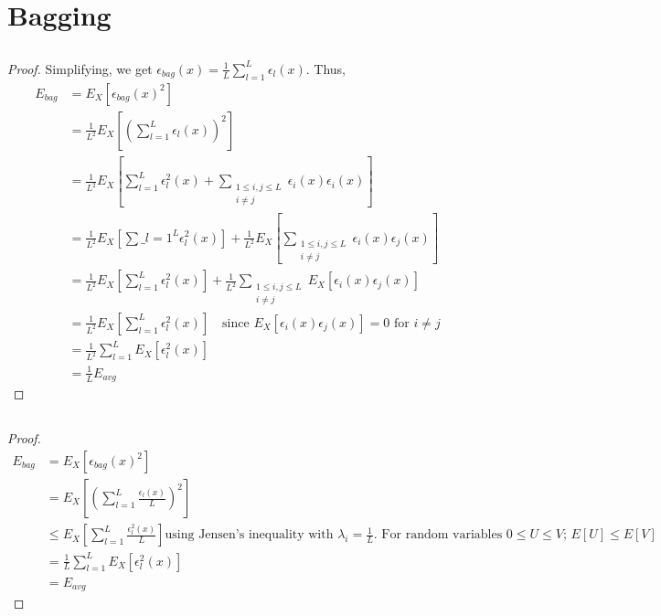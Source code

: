 \documentclass{article}
\begin{document}
\section{Bagging}
\subsection{}
\begin{proof}
	
Simplifying, we get $\epsilon_{bag}(x) = \frac{1}{L}\sum\limits_{l=1}^L \epsilon_l(x)$. Thus,
\begin{equation}
  \label{eq:1.2}
  \begin{split}
	  E_{bag} &= E_X\left[\epsilon_{bag}(x)^2\right] \\
	          &= \frac{1}{L^2}E_X\left[\left(\sum_{l=1}^L \epsilon_l(x)\right)^2\right] \\
			  &= \frac{1}{L^2}E_X\left[\sum_{l=1}^L \epsilon_l^2(x) + \sum_{\substack{1\leq i,j\leq L \\ i \neq j}}\epsilon_i(x)\epsilon_i(x) \right] \\
			  &= \frac{1}{L^2}E_X\left[\sum\_{l=1}^L \epsilon_l^2(x)\right]+ \frac{1}{L^2}E_X\left[\sum_{\substack{1\leq i,j\leq L \\ i \neq j}}\epsilon_i(x)\epsilon_j(x) \right] \\
			  &= \frac{1}{L^2}E_X\left[\sum_{l=1}^L \epsilon_l^2(x)\right]+ \frac{1}{L^2}\sum_{\substack{1\leq i,j\leq L \\ i \neq j}}E_X\left[\epsilon_i(x)\epsilon_j(x) \right] \\
			  &= \frac{1}{L^2}E_X\left[\sum_{l=1}^L \epsilon_l^2(x)\right] \quad \text{since $E_X\left[\epsilon_i(x)\epsilon_j(x)\right]=0$ for $i \neq j$} \\
			  &= \frac{1}{L^2} \sum_{l=1}^L E_X\left[ \epsilon_l^2(x)\right] \\
			  &= \frac{1}{L}E_{avg}
  \end{split}
\end{equation}
\end{proof}


\subsection{}
\begin{proof}
\begin{equation}
  \label{eq:1.3}
  \begin{split}
	  E_{bag} &= E_X\left[\epsilon_{bag}(x)^2\right] \\
	          &= E_X\left[\left(\sum_{l=1}^L \frac{\epsilon_l(x)}{L}\right)^2\right] \\
			  &\leq E_X\left[\sum_{l=1}^L \frac{\epsilon_l^2(x)}{L}\right] \text{using Jensen's inequality with $\lambda_i = \frac{1}{L}$. For random variables $0\leq U\leq V$; $E[U] \leq E[V]$ } \\
			  &= \frac{1}{L}\sum_{l=1}^L E_X\left[ \epsilon_l^2(x)\right] \\
			  &= E_{avg}
  \end{split}
\end{equation}
\end{proof}
\end{document}
